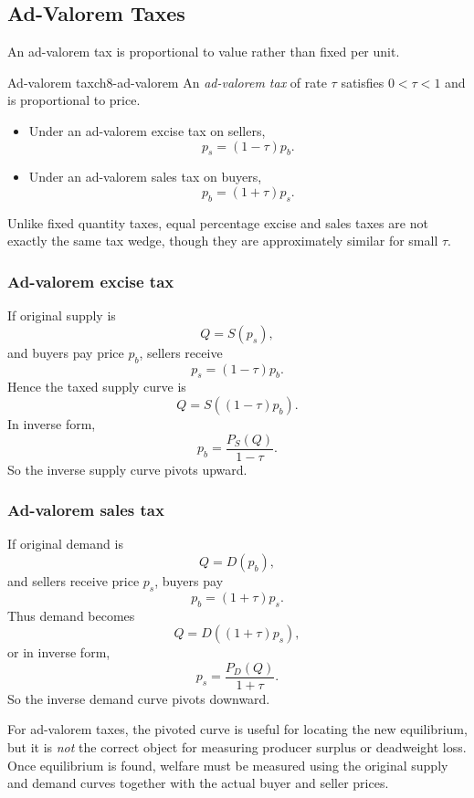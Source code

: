 \subsection{Ad-Valorem Taxes}

An ad-valorem tax is proportional to value rather than fixed per unit.

\begin{definition}{Ad-valorem tax}{ch8-ad-valorem}
An \emph{ad-valorem tax} of rate $\tau$ satisfies $0<\tau<1$ and is proportional to price.
\begin{itemize}
    \item Under an ad-valorem excise tax on sellers,
    \[
    p_s=(1-\tau)p_b.
    \]
    \item Under an ad-valorem sales tax on buyers,
    \[
    p_b=(1+\tau)p_s.
    \]
\end{itemize}
\end{definition}

Unlike fixed quantity taxes, equal percentage excise and sales taxes are not exactly the same tax wedge, though they are approximately similar for small $\tau$.

\subsubsection{Ad-valorem excise tax}

If original supply is
\[
Q=S(p_s),
\]
and buyers pay price $p_b$, sellers receive
\[
p_s=(1-\tau)p_b.
\]
Hence the taxed supply curve is
\[
Q=S((1-\tau)p_b).
\]
In inverse form,
\[
p_b=\frac{P_S(Q)}{1-\tau}.
\]
So the inverse supply curve pivots upward.

\subsubsection{Ad-valorem sales tax}

If original demand is
\[
Q=D(p_b),
\]
and sellers receive price $p_s$, buyers pay
\[
p_b=(1+\tau)p_s.
\]
Thus demand becomes
\[
Q=D((1+\tau)p_s),
\]
or in inverse form,
\[
p_s=\frac{P_D(Q)}{1+\tau}.
\]
So the inverse demand curve pivots downward.

\begin{commonmistake}
For ad-valorem taxes, the pivoted curve is useful for locating the new equilibrium, but it is \emph{not} the correct object for measuring producer surplus or deadweight loss. Once equilibrium is found, welfare must be measured using the original supply and demand curves together with the actual buyer and seller prices.
\end{commonmistake}


